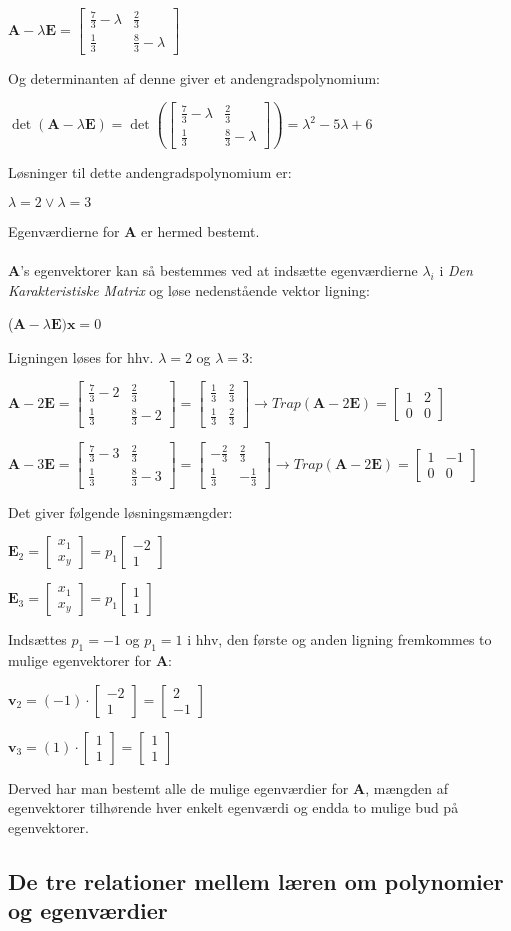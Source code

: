 \documentclass{article}
\newcommand{\cent}[1]{\begin{center}#1\end{center}}
\newcommand{\vekt}[2]{\ensuremath{\begin{bmatrix} #1\\ #2\end{bmatrix}}}
\newcommand{\smallMatrix}[4]{\ensuremath{\begin{bmatrix}
			#1 & #2 \\
			#3 & #4
\end{bmatrix}}}
\begin{document}
	\cent{$ \textbf{A}- \lambda \textbf{E} = \smallMatrix{\frac{7}{3}- \lambda}{\frac{2}{3}}{\frac{1}{3}}{\frac{8}{3}- \lambda} $}
	
	Og determinanten af denne giver et andengradspolynomium:
	
	\cent{$ \det(\textbf{A}- \lambda \textbf{E}) = \det(\smallMatrix{\frac{7}{3}- \lambda}{\frac{2}{3}}{\frac{1}{3}}{\frac{8}{3}- \lambda})= \lambda^2-5\lambda+6$}
	
	Løsninger til dette andengradspolynomium er:
	
	\cent{$ \lambda = 2 \vee \lambda = 3 $}
	
	Egenværdierne for \textbf{A} er hermed bestemt.\\\\
	\textbf{A}'s egenvektorer kan så bestemmes ved at indsætte egenværdierne $\lambda_i$ i \textit{Den Karakteristiske Matrix} og løse nedenstående vektor ligning:
	
	\cent{($ \textbf{A}-\lambda \textbf{E})\textbf{x}=0$}
	
	Ligningen løses for hhv. $\lambda=2$ og $\lambda=3$:
	
	\cent{$ \textbf{A}-2\textbf{E}=\smallMatrix{\frac{7}{3}-2}{\frac{2}{3}}{\frac{1}{3}}{\frac{8}{3}-2} = \smallMatrix{\frac{1}{3}}{\frac{2}{3}}{\frac{1}{3}}{\frac{2}{3}} \rightarrow Trap(\textbf{A}-2\textbf{E})=\smallMatrix{1}{2}{0}{0} $}
	
	\cent{$ \textbf{A}-3\textbf{E}=\smallMatrix{\frac{7}{3}-3}{\frac{2}{3}}{\frac{1}{3}}{\frac{8}{3}-3} = \smallMatrix{-\frac{2}{3}}{\frac{2}{3}}{\frac{1}{3}}{-\frac{1}{3}} \rightarrow Trap(\textbf{A}-2\textbf{E})=\smallMatrix{1}{-1}{0}{0} $}
	
	
	Det giver følgende løsningsmængder:
	
	\cent{$ \textbf{E}_2 = \vekt{x_1}{x_y} = p_1 \vekt{-2}{1} $}
	\cent{$ \textbf{E}_3 = \vekt{x_1}{x_y} = p_1 \vekt{1}{1} $}
	
	Indsættes $ p_1 = -1 $ og $ p_1=1 $ i hhv, den første og anden ligning fremkommes to mulige egenvektorer for \textbf{A}:
	
	\cent{$ \textbf{v}_2 = (-1) \cdot \vekt{-2}{1} = \vekt{2}{-1} $}
	\cent{$ \textbf{v}_3 = (1) \cdot \vekt{1}{1} = \vekt{1}{1} $}
	
	Derved har man bestemt alle de mulige egenværdier for \textbf{A}, mængden af egenvektorer tilhørende hver enkelt egenværdi og endda to mulige bud på egenvektorer.
	
	\subsection{De tre relationer mellem læren om polynomier og egenværdier}
	
\end{document}
